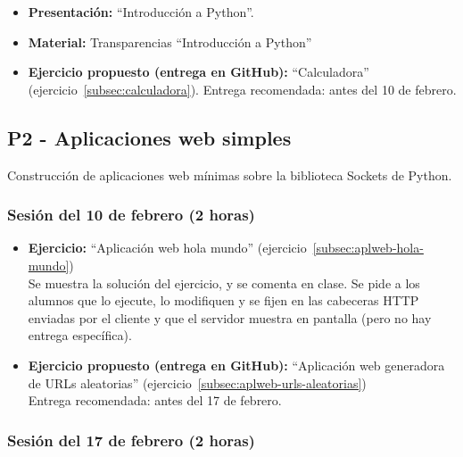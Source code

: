 \documentclass[a4paper,12pt]{article}
\begin{document}
\begin{itemize}
\item \textbf{Presentación:} ``Introducción a Python''.
\item \textbf{Material:} Transparencias ``Introducción a Python''
\item \textbf{Ejercicio propuesto (entrega en GitHub):} ``Calculadora'' (ejercicio~\ref{subsec:calculadora}).
   Entrega recomendada: antes del 10 de febrero.

\end{itemize}


\subsection{P2 - Aplicaciones web simples}

Construcción de aplicaciones web mínimas sobre la biblioteca Sockets de Python.

\subsubsection{Sesión del 10 de febrero (2 horas)}

\begin{itemize}
 \item \textbf{Ejercicio:} ``Aplicación web hola mundo'' (ejercicio~\ref{subsec:aplweb-hola-mundo}) \\
   Se muestra la solución del ejercicio, y se comenta en clase. Se pide a los alumnos que lo ejecute, lo modifiquen y se fijen en las cabeceras HTTP enviadas por el cliente y que el servidor muestra en pantalla (pero no hay entrega específica).
 \item \textbf{Ejercicio propuesto (entrega en GitHub):} ``Aplicación web generadora de URLs aleatorias'' (ejercicio~\ref{subsec:aplweb-urls-aleatorias}) \\
   Entrega recomendada: antes del 17 de febrero.
\end{itemize}

\subsubsection{Sesión del 17 de febrero (2 horas)}
\end{document}
